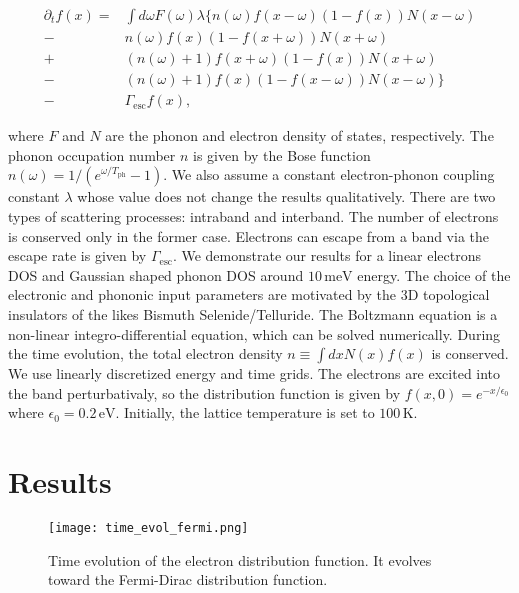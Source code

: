 \documentclass[aps,prl,twocolumn,showpacs,floatfix,superscriptaddress]{revtex4-1}
\newcommand{\eV}{\,\mathrm{eV}}
\newcommand{\meV}{\,\mathrm{meV}}
\begin{document}
\begin{align}
\partial_t f(x) = & \int d\omega F(\omega)\lambda \bigg\{n(\omega)f(x-\omega)(1-f(x))N(x-\omega) \nonumber \\
- & n(\omega)f(x)(1-f(x+\omega))N(x+\omega)\nonumber \\
+ &(n(\omega)+1)f(x+\omega)(1-f(x))N(x+\omega)\nonumber \\
- &(n(\omega)+1)f(x)(1-f(x-\omega))N(x-\omega)\bigg \}\nonumber \\
 - & \Gamma_\mathrm{esc}f(x),\label{eqn:BTE}         
\end{align}

where $F$ and $N$ are the phonon and electron density of states, respectively. The phonon occupation number $n$ is given by the Bose function $n(\omega)=1/(e^{\omega/T_\mathrm{ph}}-1)$.  We also assume a constant electron-phonon coupling constant $\lambda$ whose value does not change the results qualitatively. There are two types of scattering processes: intraband and interband. The number of electrons is conserved only in the former case. Electrons can escape from a band via the escape rate is given by $\Gamma_\mathrm{esc}$. We demonstrate our results for a linear electrons DOS and Gaussian shaped phonon DOS around $10\meV$ energy. The choice of the electronic and phononic input parameters are motivated by the 3D topological insulators of the likes Bismuth Selenide/Telluride\cite{Sobota}. The Boltzmann equation is a non-linear integro-differential equation, which can be solved numerically. During the time evolution, the total electron density $n \equiv \int dx N(x)f(x)$ is conserved. We use linearly discretized energy and time grids. The electrons are excited into the band perturbativaly, so the distribution function is given by $f(x,0) = e^{-x/\epsilon_0}$ where $\epsilon_0=0.2\eV$. Initially, the lattice temperature is set to $100\,\mathrm{K}$.

\section{Results}

\begin{figure}
        \texttt{[image: time\_evol\_fermi.png]}
        \caption{Time evolution of the electron distribution function. It evolves toward the Fermi-Dirac distribution function.}
        \label{fig:tevolution}
\end{figure}
\end{document}
